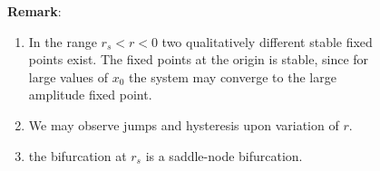 \begin{figure}[H]
	\centering
	\begin{multicols}{2}
		\begin{figure}[H]
		\end{figure}\columnbreak
		\textbf{Remark}:
		\begin{enumerate}[label={$\arabic*)$}]
			\item In the range $r_s<r<0$ two qualitatively different stable fixed points exist. The fixed points at the origin is \underline{} stable, since for large values of $x_0$ the system may converge to the large amplitude fixed point.
			\item We may observe jumps and hysteresis upon variation of $r$.
			\item the bifurcation at $r_s$ is a saddle-node bifurcation.
		\end{enumerate}
	\end{multicols}
\end{figure}

